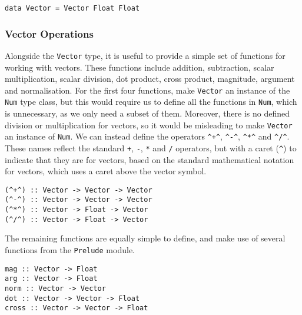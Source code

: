 \documentclass[../main.tex]{subfiles}
\begin{document}
            \begin{lstlisting}[label={lst:vector}, caption={The Vector type definition.}]
data Vector = Vector Float Float\end{lstlisting}

            \subsubsection{Vector Operations}
                Alongside the \verb|Vector| type, it is useful to provide a simple set of
                    functions for working with vectors.
                These functions include addition, subtraction, scalar multiplication, scalar
                    division, dot product, cross product, magnitude, argument and normalisation.
                For the first four functions, make \verb|Vector| an instance of the \verb|Num|
                    type class, but this would require us to define all the functions in
                    \verb|Num|, which is unnecessary, as we only need a subset of them.
                Moreover, there is no defined division or multiplication for vectors, so it
                    would be misleading to make \verb|Vector| an instance of \verb|Num|.
                We can instead define the operators \verb|^+^|, \verb|^-^|, \verb|^*^| and
                    \verb|^/^|.
                These names reflect the standard \verb|+|, \verb|-|, \verb|*| and \verb|/|
                    operators, but with a caret (\verb|^|) to indicate that they are for vectors,
                    based on the standard mathematical notation for vectors, which uses a caret
                    above the vector symbol.

                \begin{lstlisting}[label={lst:vectorOps}, caption={The vector operators.}]
(^+^) :: Vector -> Vector -> Vector
(^-^) :: Vector -> Vector -> Vector
(^*^) :: Vector -> Float -> Vector
(^/^) :: Vector -> Float -> Vector\end{lstlisting}

                The remaining functions are equally simple to define, and make use of several
                    functions from the \verb|Prelude| module.

                \begin{lstlisting}[label={lst:vectorFns}, caption={The remaining vector functions.}]
mag :: Vector -> Float
arg :: Vector -> Float
norm :: Vector -> Vector
dot :: Vector -> Vector -> Float
cross :: Vector -> Vector -> Float\end{lstlisting}
\end{document}
